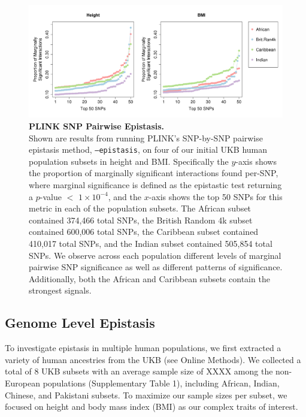 \documentclass[12pt, a4paper]{article}
\begin{document}
\begin{figure}[t]
\centering
\includegraphics[scale=.35]{Images/Supp/InterPath_Supp_Figure_PLINK_vs2.png}
\caption[PLINK SNP Pairwise Epistasis]{\textbf{PLINK SNP Pairwise Epistasis.} \\ Shown are results from running PLINK's SNP-by-SNP pairwise epistasis method, \texttt{--epistasis}, on four of our initial UKB human population subsets in height and BMI. Specifically the $y$-axis shows the proportion of marginally significant interactions found per-SNP, where marginal significance is defined as the epistastic test returning a $p$-value $<$ $1\times10^{-4}$, and the $x$-axis shows the top 50 SNPs for this metric in each of the population subsets. The African subset contained 374,466 total SNPs, the British Random 4k subset contained 600,006 total SNPs, the Caribbean subset contained 410,017 total SNPs, and the Indian subset contained 505,854 total SNPs. We observe across each population different levels of marginal pairwise SNP significance as well as different patterns of significance. Additionally, both the African and Caribbean subsets contain the strongest signals.}
\label{InterPath-Supp-Figure-PLINK}
\end{figure}







\subsection{Genome Level Epistasis}\label{InterPath-Results-GenomeEpistasis}

To investigate epistasis in multiple human populations, we first extracted a variety of human ancestries from the UKB (see Online Methods). We collected a total of 8 UKB subsets with an average sample size of XXXX among the non-European populations (Supplementary Table 1), including African, Indian, Chinese, and Pakistani subsets. To maximize our sample sizes per subset, we focused on height and body mass index (BMI) as our complex traits of interest. 
\end{document}
